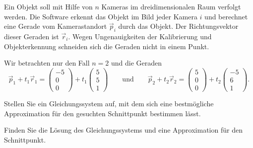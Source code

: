 Ein Objekt soll mit Hilfe von $n$ Kameras im dreidimensionalen Raum
verfolgt werden.
Die Software erkennt das Objekt im Bild jeder Kamera $i$ und berechnet
eine Gerade vom Kamerastandort $\vec p_i$ durch das Objekt.
Der Richtungsvektor dieser Geraden ist $\vec r_i$.
Wegen Ungenauigkeiten der Kalibrierung und Objekterkennung schneiden
sich die Geraden nicht in einem Punkt.

Wir betrachten nur den Fall $n=2$ und die Geraden
\[
\vec p_1+t_1\vec r_1
=
\begin{pmatrix}-5\\0\\0\end{pmatrix}
+
t_1\begin{pmatrix}5\\5\\1\end{pmatrix}
\qquad\text{und}\qquad
\vec p_2+t_2\vec r_2
=
\begin{pmatrix}5\\0\\0\end{pmatrix}
+
t_2\begin{pmatrix}-5\\6\\1\end{pmatrix}.
\]

\begin{teilaufgaben}
\item
Stellen Sie ein Gleichungssystem auf, mit dem sich eine bestmögliche
Approximation für den gesuchten Schnittpunkt bestimmen lässt.
\item
Finden Sie die Lösung des Gleichungssystems und eine Approximation für den
Schnittpunkt.
\end{teilaufgaben}

